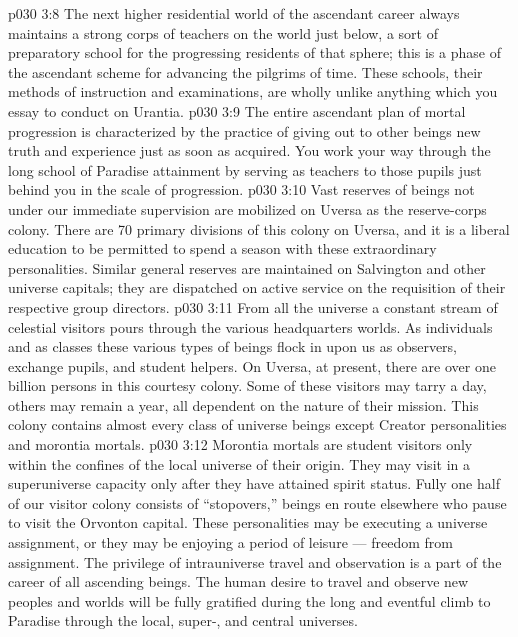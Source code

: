 \vs p030 3:8 \bibnobreakspace {} The next higher residential world of the ascendant career always maintains a strong corps of teachers on the world just below, a sort of preparatory school for the progressing residents of that sphere; this is a phase of the ascendant scheme for advancing the pilgrims of time. These schools, their methods of instruction and examinations, are wholly unlike anything which you essay to conduct on Urantia.
\vs p030 3:9 The entire ascendant plan of mortal progression is characterized by the practice of giving out to other beings new truth and experience just as soon as acquired. You work your way through the long school of Paradise attainment by serving as teachers to those pupils just behind you in the scale of progression.
\vs p030 3:10 \bibnobreakspace {} Vast reserves of beings not under our immediate supervision are mobilized on Uversa as the reserve\hyp{}corps colony. There are 70 primary divisions of this colony on Uversa, and it is a liberal education to be permitted to spend a season with these extraordinary personalities. Similar general reserves are maintained on Salvington and other universe capitals; they are dispatched on active service on the requisition of their respective group directors.
\vs p030 3:11 \bibnobreakspace {} From all the universe a constant stream of celestial visitors pours through the various headquarters worlds. As individuals and as classes these various types of beings flock in upon us as observers, exchange pupils, and student helpers. On Uversa, at present, there are over one billion persons in this courtesy colony. Some of these visitors may tarry a day, others may remain a year, all dependent on the nature of their mission. This colony contains almost every class of universe beings except Creator personalities and morontia mortals.
\vs p030 3:12 Morontia mortals are student visitors only within the confines of the local universe of their origin. They may visit in a superuniverse capacity only after they have attained spirit status. Fully one half of our visitor colony consists of “stopovers,” beings en route elsewhere who pause to visit the Orvonton capital. These personalities may be executing a universe assignment, or they may be enjoying a period of leisure --- freedom from assignment. The privilege of intrauniverse travel and observation is a part of the career of all ascending beings. The human desire to travel and observe new peoples and worlds will be fully gratified during the long and eventful climb to Paradise through the local, super-, and central universes.
